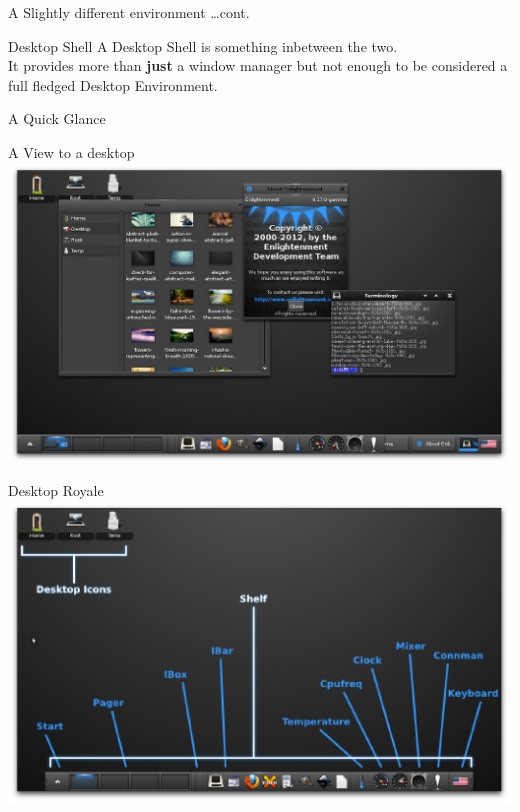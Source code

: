 \documentclass{beamer}
\begin{document}
    \begin{frame}{A Slightly different environment \ldots}{cont.}
        \begin{block}{Desktop Shell}
            A Desktop Shell is something inbetween the two. \\
            It provides more than {\bf just} a window manager but not enough to
            be considered a full fledged Desktop Environment.
        \end{block}
    \end{frame}

    \begin{frame}
        \center\huge A Quick Glance
    \end{frame}

    \begin{frame}{A View to a desktop}
        \includegraphics[scale=0.5]{img/e-shot-main.eps}
    \end{frame}

    \begin{frame}{Desktop Royale}
        \includegraphics[scale=0.5]{img/e-elements.eps}
    \end{frame}
\end{document}
